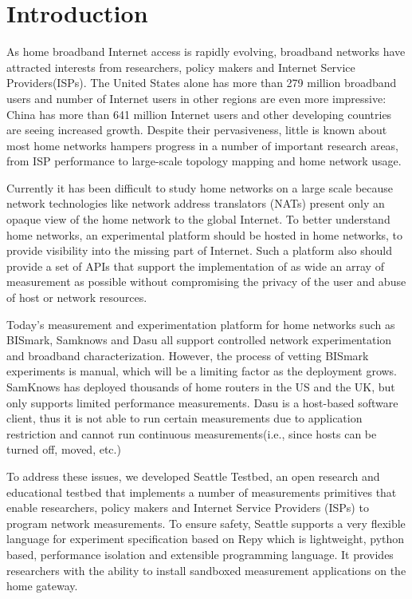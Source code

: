 \section{Introduction}
\label{sec.introduction}
As home broadband Internet access is rapidly evolving, broadband networks have attracted interests from researchers, policy makers and Internet Service Providers(ISPs). The United States alone has more than 279 million broadband users and number of Internet users in other regions are even more impressive: China has more than 641 million Internet users and other developing countries are seeing increased growth. Despite their pervasiveness, little is known about most home networks hampers progress in a number of important research areas, from ISP performance to large-scale topology mapping and home network usage.

Currently it has been difficult to study home networks on a large scale because network technologies like network address translators (NATs) present only an opaque view of the home network to the global Internet. To better understand home networks, an experimental platform should be hosted in home networks, to provide visibility into the missing part of Internet. Such a platform also should provide a set of APIs that support the implementation of as wide an array of measurement as possible without compromising the privacy of the user and abuse of host or network resources. 

Today's measurement and experimentation platform for home networks such as BISmark, Samknows and Dasu all support controlled network experimentation and broadband characterization. However, the process of vetting BISmark experiments is manual, which will be a limiting factor as the deployment grows. SamKnows has deployed thousands of home routers in the US and the UK, but only supports limited performance measurements. Dasu is a host-based software client, thus it is not able to run certain measurements due to application restriction and cannot run continuous measurements(i.e., since hosts can be turned off, moved, etc.)
 
To address these issues, we developed Seattle Testbed, an open research and educational testbed that implements a number of measurements primitives that enable researchers, policy makers and Internet Service Providers (ISPs) to program network measurements. To ensure safety, Seattle supports a very flexible language for experiment specification based on Repy which is lightweight, python based, performance isolation and extensible programming language. It provides researchers with the ability to install sandboxed measurement applications on the home gateway. 

